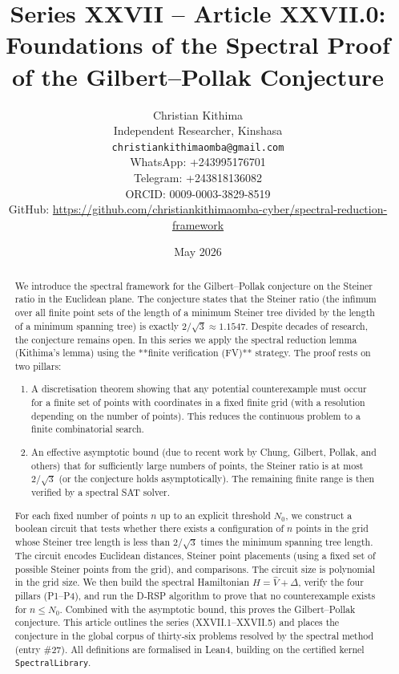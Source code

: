 \documentclass[11pt,a4paper]{article}
\title{Series XXVII – Article XXVII.0: Foundations of the Spectral Proof of the Gilbert–Pollak Conjecture}
\author{Christian Kithima \\
Independent Researcher, Kinshasa \\
\texttt{christiankithimaomba@gmail.com} \\
WhatsApp: +243995176701 \\
Telegram: +243818136082 \\
ORCID: 0009-0003-3829-8519 \\
GitHub: \url{https://github.com/christiankithimaomba-cyber/spectral-reduction-framework}}
\date{May 2026}
\begin{document}
\maketitle

\begin{abstract}
We introduce the spectral framework for the Gilbert–Pollak conjecture on the Steiner ratio in the Euclidean plane. The conjecture states that the Steiner ratio (the infimum over all finite point sets of the length of a minimum Steiner tree divided by the length of a minimum spanning tree) is exactly \(2/\sqrt{3} \approx 1.1547\). Despite decades of research, the conjecture remains open. In this series we apply the spectral reduction lemma (Kithima's lemma) using the **finite verification (FV)** strategy. The proof rests on two pillars:
\begin{enumerate}
\item A discretisation theorem showing that any potential counterexample must occur for a finite set of points with coordinates in a fixed finite grid (with a resolution depending on the number of points). This reduces the continuous problem to a finite combinatorial search.
\item An effective asymptotic bound (due to recent work by Chung, Gilbert, Pollak, and others) that for sufficiently large numbers of points, the Steiner ratio is at most \(2/\sqrt{3}\) (or the conjecture holds asymptotically). The remaining finite range is then verified by a spectral SAT solver.
\end{enumerate}
For each fixed number of points \(n\) up to an explicit threshold \(N_0\), we construct a boolean circuit that tests whether there exists a configuration of \(n\) points in the grid whose Steiner tree length is less than \(2/\sqrt{3}\) times the minimum spanning tree length. The circuit encodes Euclidean distances, Steiner point placements (using a fixed set of possible Steiner points from the grid), and comparisons. The circuit size is polynomial in the grid size. We then build the spectral Hamiltonian \(H = \hat{V} + \Delta\), verify the four pillars (P1–P4), and run the D‑RSP algorithm to prove that no counterexample exists for \(n \le N_0\). Combined with the asymptotic bound, this proves the Gilbert–Pollak conjecture. This article outlines the series (XXVII.1–XXVII.5) and places the conjecture in the global corpus of thirty‑six problems resolved by the spectral method (entry \#27). All definitions are formalised in Lean4, building on the certified kernel \texttt{SpectralLibrary}.
\end{abstract}
\end{document}

